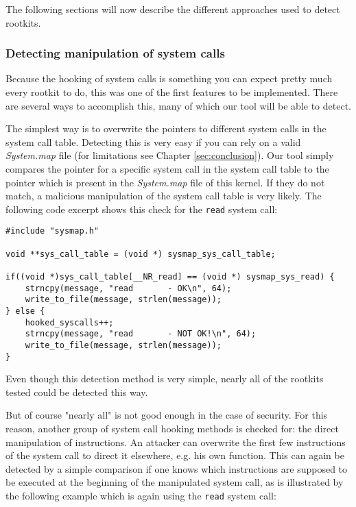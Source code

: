 \documentclass[10pt, letterpaper]{scrartcl}
\begin{document}
The following sections will now describe the different approaches used to detect rootkits.

\subsubsection{Detecting manipulation of system calls}
Because the hooking of system calls is something you can expect pretty much every rootkit to do, this was one of the first features to be implemented. There are several ways to accomplish this, many of which our tool will be able to detect.

The simplest way is to overwrite the pointers to different system calls in the system call table.
Detecting this is very easy if you can rely on a valid \emph{System.map} file (for limitations see Chapter \ref{sec:conclusion}).
Our tool simply compares the pointer for a specific system call in the system call table to the pointer which is present in the \emph{System.map} file of this kernel.
If they do not match, a malicious manipulation of the system call table is very likely.
The following code excerpt shows this check for the \texttt{read} system call:

\begin{center}
\begin{lstlisting}
#include "sysmap.h"

void **sys_call_table = (void *) sysmap_sys_call_table;

if((void *)sys_call_table[__NR_read] == (void *) sysmap_sys_read) {
	strncpy(message, "read       - OK\n", 64);
	write_to_file(message, strlen(message));
} else {
	hooked_syscalls++;
	strncpy(message, "read       - NOT OK!\n", 64);
	write_to_file(message, strlen(message));
}
\end{lstlisting}
\end{center}

Even though this detection method is very simple, nearly all of the rootkits tested could be detected this way.

But of course "nearly all" is not good enough in the case of security.
For this reason, another group of system call hooking methods is checked for: the direct manipulation of instructions.
An attacker can overwrite the first few instructions of the system call to direct it elsewhere, e.g. his own function.
This can again be detected by a simple comparison if one knows which instructions are supposed to be executed at the beginning of the manipulated system call, as is illustrated by the following example which is again using the \texttt{read} system call:
\end{document}
